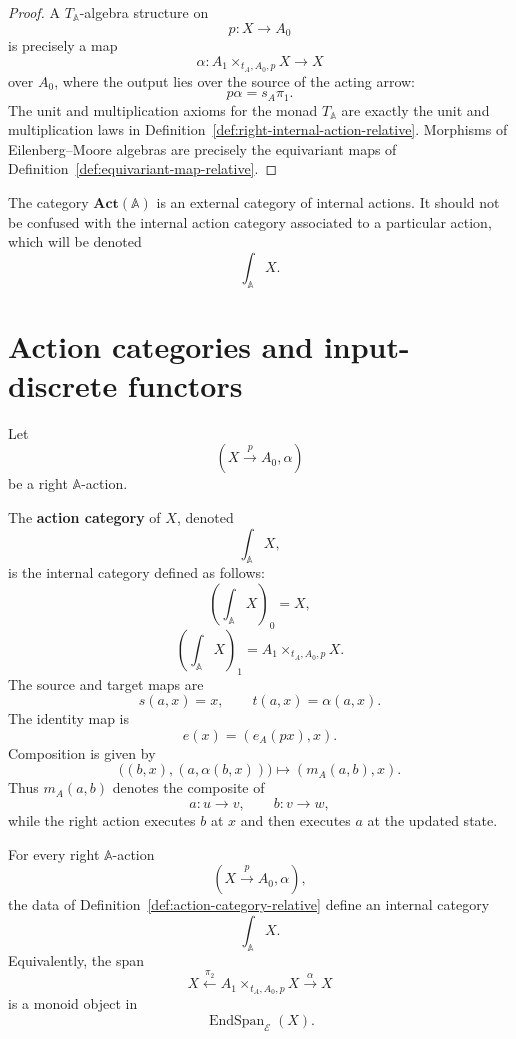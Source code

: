 \begin{proof}
A \(T_{\mathbb A}\)-algebra structure on
\[
p:X\to A_0
\]
is precisely a map
\[
\alpha:
A_1\times_{t_A,A_0,p}X\to X
\]
over \(A_0\), where the output lies over the source of the acting arrow:
\[
p\alpha=s_A\pi_1.
\]
The unit and multiplication axioms for the monad \(T_{\mathbb A}\) are exactly
the unit and multiplication laws in
Definition~\ref{def:right-internal-action-relative}. Morphisms of
Eilenberg--Moore algebras are precisely the equivariant maps of
Definition~\ref{def:equivariant-map-relative}.
\end{proof}

\begin{remark}
\label{rem:external-em-versus-internal-action-category}
The category \(\mathbf{Act}(\mathbb A)\) is an external category of internal
actions. It should not be confused with the internal action category associated
to a particular action, which will be denoted
\[
\int_{\mathbb A}X.
\]
\end{remark}

\section{Action categories and input-discrete functors}
\label{sec:action-categories-input-discrete}

Let
\[
(X\xrightarrow{p}A_0,\alpha)
\]
be a right \(\mathbb A\)-action.

\begin{definition}
\label{def:action-category-relative}
The \textbf{action category} of \(X\), denoted
\[
\int_{\mathbb A}X,
\]
is the internal category defined as follows:
\[
\left(\int_{\mathbb A}X\right)_0=X,
\]
\[
\left(\int_{\mathbb A}X\right)_1
=
A_1\times_{t_A,A_0,p}X.
\]
The source and target maps are
\[
s(a,x)=x,
\qquad
t(a,x)=\alpha(a,x).
\]
The identity map is
\[
e(x)=(e_A(px),x).
\]
Composition is given by
\[
\bigl((b,x),(a,\alpha(b,x))\bigr)
\longmapsto
(m_A(a,b),x).
\]
Thus \(m_A(a,b)\) denotes the composite of
\[
a:u\to v,
\qquad
b:v\to w,
\]
while the right action executes \(b\) at \(x\) and then executes \(a\) at the
updated state.
\end{definition}

\begin{theorem}
\label{thm:action-category-is-internal-category}
For every right \(\mathbb A\)-action
\[
(X\xrightarrow{p}A_0,\alpha),
\]
the data of Definition~\ref{def:action-category-relative} define an internal
category
\[
\int_{\mathbb A}X.
\]
Equivalently, the span
\[
X
\xleftarrow{\pi_2}
A_1\times_{t_A,A_0,p}X
\xrightarrow{\alpha}
X
\]
is a monoid object in
\[
\operatorname{EndSpan}_{\mathcal E}(X).
\]
\end{theorem}

